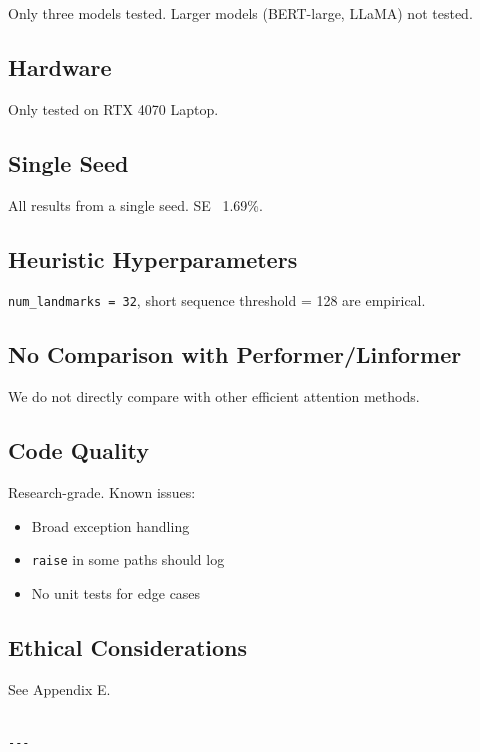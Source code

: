 Only three models tested. Larger models (BERT-large, LLaMA) not tested.

\subsection{Hardware}

Only tested on RTX 4070 Laptop.

\subsection{Single Seed}

All results from a single seed. SE ~1.69\%.

\subsection{Heuristic Hyperparameters}

\texttt{num\_landmarks = 32}, short sequence threshold = 128 are empirical.

\subsection{No Comparison with Performer/Linformer}

We do not directly compare with other efficient attention methods.

\subsection{Code Quality}

Research-grade. Known issues:
\begin{itemize}
\item Broad exception handling
\item \texttt{raise} in some paths should log
\item No unit tests for edge cases

\end{itemize}
\subsection{Ethical Considerations}

See Appendix E.
\begin{lstlisting}

---
\end{lstlisting}


